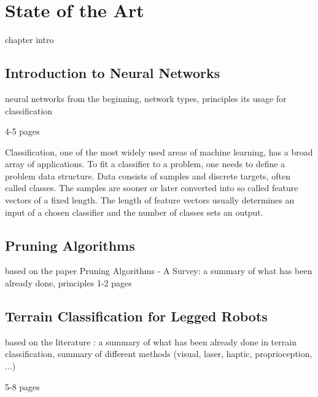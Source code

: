 \chapter{State of the Art} \label{chap:state_of_the_art}

chapter intro



\section{Introduction to Neural Networks} \label{sec:intro_to_nn}

neural networks from the beginning, network types, principles its usage for classification

4-5 pages

Classification, one of the most widely used areas of machine learning, has a broad array of applications. To fit a classifier to a problem, one needs to define a problem data structure. Data consists of samples and discrete targets, often called classes. The samples are sooner or later converted into so called feature vectors of a fixed length. The length of feature vectors usually determines an input of a chosen classifier and the number of classes sets an output.

\section{Pruning Algorithms} \label{sec:pruning_algorithms}

based on the paper Pruning Algorithms - A Survey: a summary of what has been already done, principles 
1-2 pages

\section{Terrain Classification for Legged Robots}

based on the literature : a summary of what has been already done in terrain classification, summary of different methods (visual, laser, haptic, proprioception, ...)

5-8 pages